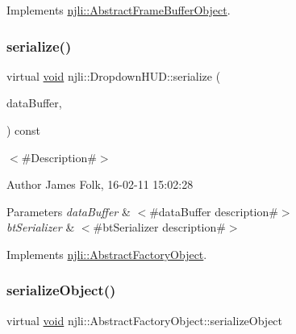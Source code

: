 Implements \mbox{\hyperlink{classnjli_1_1_abstract_frame_buffer_object_aa75a537f5745e4be8f749892d195b43c}{njli\+::\+Abstract\+Frame\+Buffer\+Object}}.

\mbox{\label{classnjli_1_1_dropdown_h_u_d_a19985f39f0f49c11109a10a34e293281}} 
\subsubsection{\texorpdfstring{serialize()}{serialize()}}
{\footnotesize\ttfamily virtual \mbox{\hyperlink{_thread_8h_af1e856da2e658414cb2456cb6f7ebc66}{void}} njli\+::\+Dropdown\+H\+U\+D\+::serialize (\begin{DoxyParamCaption}\item[{\mbox{\hyperlink{_thread_8h_af1e856da2e658414cb2456cb6f7ebc66}{void}} $\ast$}]{data\+Buffer,  }\item[{bt\+Serializer $\ast$}]{ }\end{DoxyParamCaption}) const\hspace{0.3cm}{\ttfamily [virtual]}}



$<$\#\+Description\#$>$ 

\begin{DoxyAuthor}{Author}
James Folk, 16-\/02-\/11 15\+:02\+:28
\end{DoxyAuthor}

\begin{DoxyParams}{Parameters}
{\em data\+Buffer} & $<$\#data\+Buffer description\#$>$ \\
\hline
{\em bt\+Serializer} & $<$\#bt\+Serializer description\#$>$ \\
\hline
\end{DoxyParams}


Implements \mbox{\hyperlink{classnjli_1_1_abstract_factory_object_aad2fbe86fb3bdecf02918a96b9c57976}{njli\+::\+Abstract\+Factory\+Object}}.

\mbox{\label{classnjli_1_1_dropdown_h_u_d_a4fc4bcd9d1930911474210c047372fc0}} 
\subsubsection{\texorpdfstring{serialize\+Object()}{serializeObject()}}
{\footnotesize\ttfamily virtual \mbox{\hyperlink{_thread_8h_af1e856da2e658414cb2456cb6f7ebc66}{void}} njli\+::\+Abstract\+Factory\+Object\+::serialize\+Object}

